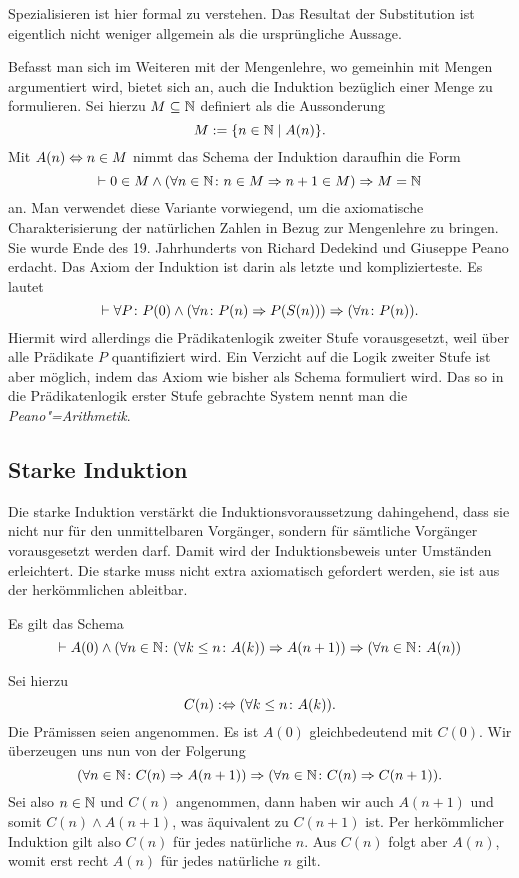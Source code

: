 \noindent
Spezialisieren ist hier formal zu verstehen. Das Resultat
der Substitution ist eigentlich nicht weniger allgemein als die
ursprüngliche Aussage.

Befasst man sich im Weiteren mit der Mengenlehre, wo gemeinhin mit
Mengen argumentiert wird, bietet sich an, auch die Induktion bezüglich
einer Menge zu formulieren. Sei hierzu $M\subseteq\mathbb N$ definiert als
die Aussonderung
\[M := \{n\in\mathbb N\mid A(n)\}.\]
Mit $A(n)\Leftrightarrow n\in M$ nimmt das Schema der Induktion daraufhin die Form
\[\vdash 0\in M\land (\forall n\in\mathbb N\colon n\in M\Rightarrow n+1\in M)\Rightarrow M = \mathbb N\]
an. Man verwendet diese Variante vorwiegend, um die axiomatische
Charakterisierung der natürlichen Zahlen in Bezug zur Mengenlehre zu
bringen. Sie wurde Ende des 19. Jahrhunderts von Richard Dedekind und
Giuseppe Peano erdacht. Das Axiom der Induktion ist darin als letzte
und komplizierteste. Es lautet
\[\vdash \forall P\colon P(0)\land (\forall n\colon P(n)\Rightarrow P(S(n)))
\Rightarrow (\forall n\colon P(n)).\]
Hiermit wird allerdings die Prädikatenlogik zweiter Stufe vorausgesetzt,
weil über alle Prädikate $P$ quantifiziert wird. Ein Verzicht auf die
Logik zweiter Stufe ist aber möglich, indem das Axiom wie bisher als
Schema formuliert wird. Das so in die Prädikatenlogik erster Stufe gebrachte
System nennt man die \emph{Peano"=Arithmetik}.

\subsection{Starke Induktion}

Die starke Induktion verstärkt die Induktionsvoraussetzung
dahingehend, dass sie nicht nur für den unmittelbaren Vorgänger, sondern
für sämtliche Vorgänger vorausgesetzt werden darf. Damit wird der
Induktionsbeweis unter Umständen erleichtert. Die starke muss nicht
extra axiomatisch gefordert werden, sie ist aus der herkömmlichen
ableitbar.
\begin{Satz}
Es gilt das Schema
\[\vdash A(0)\land (\forall n\in\mathbb N\colon (\forall k\le n\colon A(k))\Rightarrow A(n+1))
\Rightarrow (\forall n\in\mathbb N\colon A(n))\]
\end{Satz}
\begin{Beweis}
Sei hierzu
\[C(n) :\Leftrightarrow (\forall k\le n\colon A(k)).\]
Die Prämissen seien angenommen. Es ist $A(0)$
gleichbedeutend mit $C(0)$. Wir überzeugen uns nun von der Folgerung
\[(\forall n\in\mathbb N\colon C(n)\Rightarrow A(n+1))\Rightarrow (\forall n\in \mathbb N\colon C(n)\Rightarrow C(n+1)).\]
Sei also $n\in\mathbb N$ und $C(n)$ angenommen, dann haben wir auch $A(n+1)$
und somit $C(n)\land A(n+1)$, was äquivalent zu $C(n+1)$ ist. Per
herkömmlicher Induktion gilt also $C(n)$ für jedes natürliche
$n$. Aus $C(n)$ folgt aber $A(n)$, womit erst recht $A(n)$ für jedes
natürliche $n$ gilt.\,\qedsymbol
\end{Beweis}

